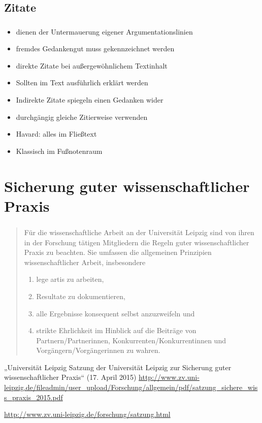 \documentclass[aspectratio=169]{beamer}
\begin{document}
\subsection{Zitate}

\begin{frame}
  \frametitle{\insertsection}%
  \framesubtitle{\insertsubsection}%
  \begin{itemize}
    \item dienen der Untermauerung eigener Argumentationslinien
    \item fremdes Gedankengut muss gekennzeichnet werden
    \item direkte Zitate bei außergewöhnlichem Textinhalt
    \item Sollten im Text ausführlich erklärt werden
    \item Indirekte Zitate spiegeln einen Gedanken wider
    \item durchgängig gleiche Zitierweise verwenden
    \item Havard: alles im Fließtext
    \item Klassisch im Fußnotenraum
  \end{itemize}
\end{frame}

\section{Sicherung guter wissenschaftlicher Praxis}
\begin{frame}
  \frametitle{\insertsection}%
  \framesubtitle{\insertsubsection}%
  \begin{quote}
   Für die wissenschaftliche Arbeit an der Universität Leipzig sind von ihren in der Forschung tätigen Mitgliedern die Regeln guter wissenschaftlicher Praxis zu beachten. Sie umfassen die allgemeinen Prinzipien wissenschaftlicher Arbeit, insbesondere
   \begin{enumerate}
    \item lege artis zu arbeiten,
    \item Resultate zu dokumentieren,
    \item alle Ergebnisse konsequent selbst anzuzweifeln und
    \item strikte Ehrlichkeit im Hinblick auf die Beiträge von Partnern/Partnerinnen, Konkurrenten/Konkurrentinnen und Vorgängern/Vorgängerinnen zu wahren. 
   \end{enumerate}
  \end{quote}
  „Universität Leipzig Satzung der Universität Leipzig zur Sicherung guter wissenschaftlicher Praxis“ (17. April 2015)
  \url{http://www.zv.uni-leipzig.de/fileadmin/user_upload/Forschung/allgemein/pdf/satzung_sichere_wiss_praxis_2015.pdf}

  \url{http://www.zv.uni-leipzig.de/forschung/satzung.html}
\end{frame}
\end{document}
